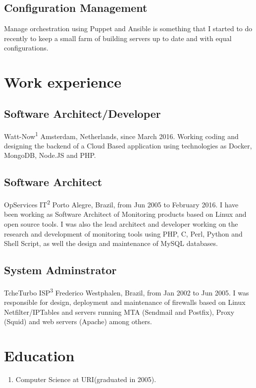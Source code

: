 \documentclass{article}
\begin{document}
\begin{multicols}{2}
\subsection{Configuration Management}
Manage orchestration using Puppet and Ansible is something that
I started to do recently to keep a small farm of building servers
up to date and with equal configurations.

\section{Work experience}
\subsection{Software Architect/Developer}
Watt-Now\textsuperscript{1} Amsterdam, Netherlands, since March 2016. Working coding
and designing the backend of a Cloud Based application using technologies as Docker,
MongoDB, Node.JS and PHP.

\subsection{Software Architect}
OpServices IT\textsuperscript{2} Porto Alegre, Brazil, from Jun 2005 to February 
2016. I have been working as Software Architect of Monitoring products based on Linux
and open source tools. I was also the lead architect and developer working on the 
research and development of monitoring tools using PHP, C, Perl, Python and Shell 
Script, as well the design and maintenance of MySQL databases.

\subsection{System Adminstrator}
TcheTurbo ISP\textsuperscript{3} Frederico Westphalen, Brazil, from Jan 2002 to Jun 2005.
I was responsible for design, deployment and maintenance of firewalls based on
Linux Netfilter/IPTables and servers running MTA (Sendmail and Postfix), Proxy
(Squid) and web servers (Apache) among others.

\section{Education}
\begin{enumerate}
\item Computer Science at URI(graduated in 2005).
\end{enumerate}


\end{multicols}
\end{document}
